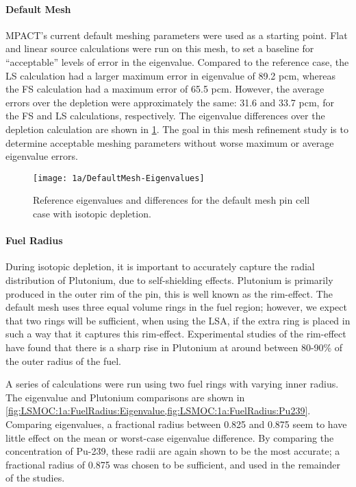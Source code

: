 {{{      \paragraph{Default Mesh}{
        MPACT's current default meshing parameters were used as a starting point.
        Flat and linear source calculations were run on this mesh, to set a baseline for ``acceptable'' levels of error in the eigenvalue.
        Compared to the reference case, the \ac{LS} calculation had a larger maximum error in eigenvalue of 89.2 \ac{pcm}, whereas the \ac{FS} calculation had a maximum error of 65.5 \ac{pcm}.
        However, the average errors over the depletion were approximately the same: 31.6 and 33.7 \ac{pcm}, for the \ac{FS} and \ac{LS} calculations, respectively.
        The eigenvalue differences over the depletion calculation are shown in \cref{fig:LSMOC:1a:DefaultMesh:Eigenvalue}.
        The goal in this mesh refinement study is to determine acceptable meshing parameters without worse maximum or average eigenvalue errors.

        \begin{figure}
            \centering
            \texttt{[image: 1a/DefaultMesh-Eigenvalues]}
            \caption{Reference eigenvalues and differences for the default mesh pin cell case with isotopic depletion. \label{fig:LSMOC:1a:DefaultMesh:Eigenvalue}}
        \end{figure}
      }
      \paragraph{Fuel Radius}{
        During isotopic depletion, it is important to accurately capture the radial distribution of Plutonium, due to self-shielding effects.
        Plutonium is primarily produced in the outer rim of the pin, this is well known as the rim-effect.
        The default mesh uses three equal volume rings in the fuel region; however, we expect that two rings will be sufficient, when using the \ac{LSA}, if the extra ring is placed in such a way that it captures this rim-effect.
        Experimental studies of the rim-effect \cite{Lassmann1994} have found that there is a sharp rise in Plutonium at around between 80-90\% of the outer radius of the fuel.

        A series of calculations were run using two fuel rings with varying inner radius.
        The eigenvalue and Plutonium comparisons are shown in \cref{fig:LSMOC:1a:FuelRadius:Eigenvalue,fig:LSMOC:1a:FuelRadius:Pu239}.
        Comparing eigenvalues, a fractional radius between 0.825 and 0.875 seem to have little effect on the mean or worst-case eigenvalue difference.
        By comparing the concentration of Pu-239, these radii are again shown to be the most accurate; a fractional radius of 0.875 was chosen to be sufficient, and used in the remainder of the studies.

}}}}
